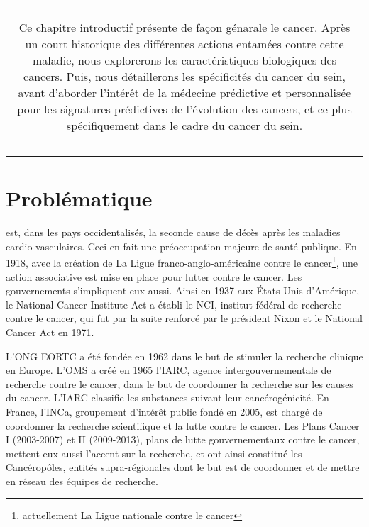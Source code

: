 \singlespacing

		\begin{center}
			\begin{tabular}{c}
				\begin{minipage}[][4cm][c]{0.8\linewidth}
					\begin{tcolorbox}[colback=red!5!white,colframe=red!75!black]
						\sffamily
						Ce chapitre introductif présente de façon génarale le cancer\index{cancer}.
						Après un court historique des différentes actions entamées contre cette maladie, nous explorerons les caractéristiques biologiques des cancers.
						Puis, nous détaillerons les spécificités du cancer du sein\index{cancer!cancer du sein}, avant d'aborder l'intérêt de la médecine prédictive et personnalisée pour les signatures prédictives de l'évolution des cancers, et ce plus spécifiquement dans le cadre du cancer du sein.
					\end{tcolorbox}
				\end{minipage}\\
				\\[2ex]
				\begin{minipage}[][4cm][c]{0.9\linewidth}
					\mtcsetdepth{minitoc}{1}
					\minitoc
				\end{minipage}
			\end{tabular}
		\end{center}
		\newpage

	\doublespacing

	\section*{\textcolor{myred}{Problématique}}\label{sec:Problématique}
		 est, dans les pays occidentalisés, la seconde cause de décès après les maladies cardio-vasculaires.
		Ceci en fait une préoccupation majeure de santé publique.
		En 1918, avec la création de La Ligue franco-anglo-américaine contre le cancer\footnote{actuellement La Ligue nationale contre le cancer}, une action associative est mise en place pour lutter contre le cancer.
		Les gouvernements s'impliquent eux aussi.
		Ainsi en 1937 aux États-Unis d'Amérique, le National Cancer Institute Act a établi le \ac{NCI}, institut fédéral de recherche contre le cancer, qui fut par la suite renforcé par le président Nixon et le National Cancer Act en 1971.

		L'\ac{ONG} \ac{EORTC} a été fondée en 1962 dans le but de stimuler la recherche clinique en Europe.
		L'\ac{OMS} a créé en 1965 l'\ac{IARC}, agence intergouvernementale de recherche contre le cancer, dans le but de coordonner la recherche sur les causes du cancer.
		L'\ac{IARC} classifie les substances suivant leur cancérogénicité.
		En France, l'\ac{INCa}, groupement d'intérêt public fondé en 2005, est chargé de coordonner la recherche scientifique et la lutte contre le cancer.
		Les Plans Cancer I (2003-2007) et II (2009-2013), plans de lutte gouvernementaux contre le cancer, mettent eux aussi l'accent sur la recherche, et ont ainsi constitué les Cancéropôles, entités supra-régionales dont le but est de coordonner et de mettre en réseau des équipes de recherche.
		
